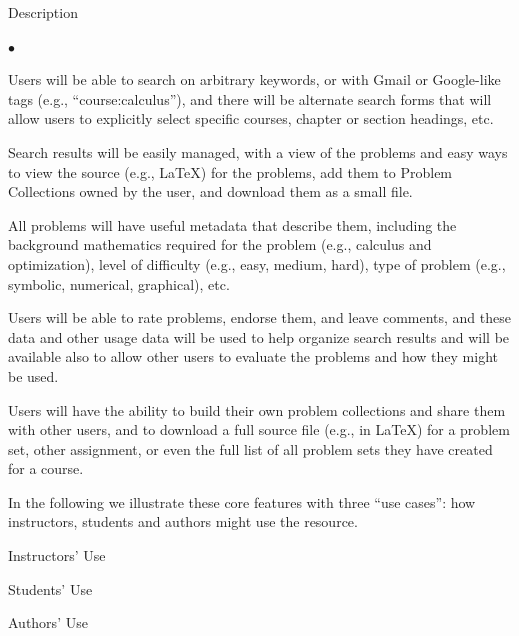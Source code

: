 \documentclass[11pt]{article}
\begin{document}
\begin{section}{Description}
\begin{list}{$\bullet$}{\setlength{\parsep}{0pt}\setlength{\itemsep}{0pt}}
  \item
    Users will be able to search on arbitrary keywords, or with Gmail or
    Google-like tags (e.g., ``course:calculus''), and there will be
    alternate search forms that will allow users to explicitly select
    specific courses, chapter or section headings, etc.
  \item
    Search results will be easily managed, with a view of the problems and
    easy ways to view the source (e.g., \LaTeX) for the problems, add them
    to Problem Collections owned by the user, and download them as a small
    file.
  \item
    All problems will have useful metadata that describe them, including
    the background mathematics required for the problem (e.g., calculus
    and optimization), level of difficulty (e.g., easy, medium, hard),
    type of problem (e.g., symbolic, numerical, graphical), etc.
  \item
    Users will be able to rate problems, endorse them, and leave comments,
    and these data and other usage data will be used to help organize
    search results and will be available also to allow other users to
    evaluate the problems and how they might be used. 
  \item
    Users will have the ability to build their own problem collections and
    share them with other users, and to download a full source file (e.g.,
    in \LaTeX) for a problem set, other assignment, or even the full list
    of all problem sets they have created for a course. 
\end{list}

In the following we illustrate these core features with three ``use
cases'': how instructors, students and authors might use the resource.



\begin{subsection}{Instructors' Use}

\end{subsection}

\begin{subsection}{Students' Use}

\end{subsection}

\begin{subsection}{Authors' Use}

\end{subsection}

\end{section}
\end{document}
